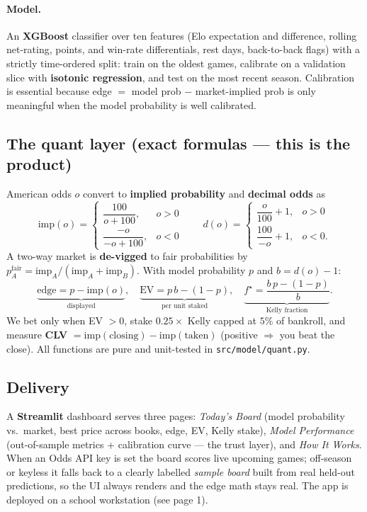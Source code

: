 \documentclass[12pt]{article}
\begin{document}
\paragraph{Model.} An \textbf{XGBoost} classifier over ten features (Elo expectation and
difference, rolling net-rating, points, and win-rate differentials, rest days, back-to-back
flags) with a
strictly time-ordered split: train on the oldest games, calibrate on a validation slice with
\textbf{isotonic regression}, and test on the most recent season. Calibration is essential
because edge $=$ model prob $-$ market-implied prob is only meaningful when the model
probability is well calibrated.

\subsection{The quant layer (exact formulas --- this is the product)}
American odds $o$ convert to \textbf{implied probability} and \textbf{decimal odds} as
\[
  \text{imp}(o)=\begin{cases}\dfrac{100}{o+100}, & o>0\\[6pt]\dfrac{-o}{-o+100}, & o<0\end{cases}
  \qquad
  d(o)=\begin{cases}\dfrac{o}{100}+1, & o>0\\[6pt]\dfrac{100}{-o}+1, & o<0.\end{cases}
\]
A two-way market is \textbf{de-vigged} to fair probabilities by
$p^{\text{fair}}_A=\text{imp}_A/(\text{imp}_A+\text{imp}_B)$. With model probability $p$ and
$b=d(o)-1$:
\[
  \underbrace{\text{edge}=p-\text{imp}(o)}_{\text{displayed}},\quad
  \underbrace{\text{EV}=p\,b-(1-p)}_{\text{per unit staked}},\quad
  \underbrace{f^{\star}=\frac{b\,p-(1-p)}{b}}_{\text{Kelly fraction}} .
\]
We bet only when EV $>0$, stake $0.25\times$ Kelly capped at $5\%$ of bankroll, and measure
\textbf{CLV} $=\text{imp}(\text{closing})-\text{imp}(\text{taken})$ (positive $\Rightarrow$ you
beat the close). All functions are pure and unit-tested in \texttt{src/model/quant.py}.

\subsection{Delivery}
A \textbf{Streamlit} dashboard serves three pages: \emph{Today's Board} (model probability vs.\
market, best price across books, edge, EV, Kelly stake), \emph{Model Performance} (out-of-sample
metrics + calibration curve --- the trust layer), and \emph{How It Works}. When an Odds API key
is set the board scores live upcoming games; off-season or keyless it falls back to a clearly
labelled \emph{sample board} built from real held-out predictions, so the UI always renders and
the edge math stays real. The app is deployed on a school workstation (see page 1).
\end{document}
